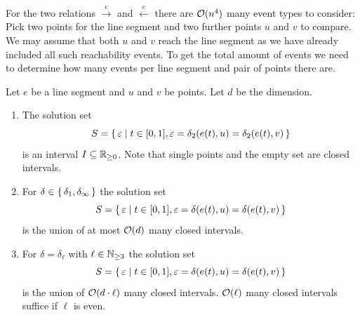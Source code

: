 For the two relations \(\overset e\rightarrow\) and \(\overset e\leftarrow\) there are \(\mathcal{O}(n^4)\) many event types to consider: Pick two points for the line segment and two further points \(u\) and \(v\) to compare. We may assume that both \(u\) and \(v\) reach the line segment as we have already included all such reachability events. To get the total amount of events we need to determine how many events per line segment and pair of points there are. 

\begin{lemma}\label{lem:event_counts}
  Let \(e\) be a line segment and \(u\) and \(v\) be points. Let \(d\) be the dimension.
	\begin{enumerate}
		\item The solution set 
			\[S = \set{\varepsilon \mid t \in [0, 1], \varepsilon = \delta_2(e(t), u) = \delta_2(e(t), v)}\]
		is an interval \(I \subseteq \mathbb{R}_{\geq 0}\). Note that single points and the empty set are closed intervals.
			
		\item For \(\delta \in \set{\delta_1, \delta_\infty}\) the solution set 
			\[S = \set{\varepsilon \mid t \in [0, 1], \varepsilon = \delta(e(t), u) = \delta(e(t), v)}\]
		is the union of at most \(\mathcal{O}(d)\) many closed intervals. 	

		\item For \(\delta = \delta_\ell\) with \(\ell \in \mathbb{N}_{\geq 3}\) the solution set 
			\[S = \set{\varepsilon \mid t \in [0, 1], \varepsilon = \delta(e(t), u) = \delta(e(t), v)}\]
			is the union of \(\mathcal{O}(d \cdot \ell)\) many closed intervals. \(\mathcal{O}(\ell)\) many closed intervals suffice if \(\ell\) is even.
	\end{enumerate}
\end{lemma}

